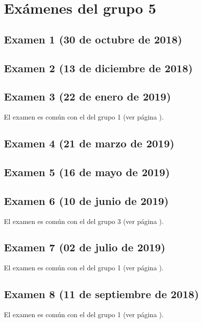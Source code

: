 \documentclass[a4paper,12pt,twoside]{book}
\begin{document}
\chapter{Exámenes del grupo 5}
\section{Examen 1 (30 de octubre de 2018)}
\section{Examen 2 (13 de diciembre de 2018)}
\section{Examen 3 (22 de enero de 2019)}
El examen es común con el del grupo 1 (ver página \pageref{examen_18_19_4_3}).
\section{Examen 4 (21 de marzo de 2019)}
\section{Examen 5 (16 de mayo de 2019)}
\section{Examen 6 (10 de junio de 2019)}
El examen es común con el del grupo 3 (ver página \pageref{examen_18_19_3_6}).
\section{Examen 7 (02 de julio de 2019)}
El examen es común con el del grupo 1 (ver página \pageref{examen_18_19_1_7}).
\section{Examen 8 (11 de septiembre de 2018)}
El examen es común con el del grupo 1 (ver página \pageref{examen_18_19_1_8}).

\appendix %




\end{document}
